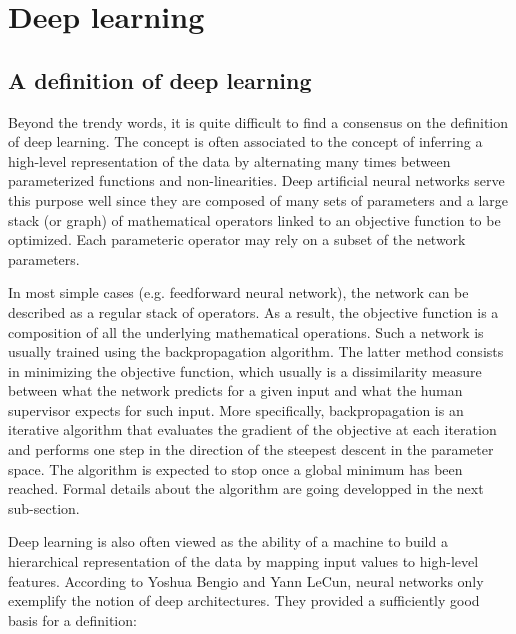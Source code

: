 \section{Deep learning}

    \subsection{A definition of deep learning}

        Beyond the trendy words, it is quite difficult to find a consensus
        on the definition of deep learning. The concept is often associated to
        the concept of inferring a high-level representation of the data
        by alternating many times between parameterized functions and non-linearities.
        Deep artificial neural networks serve this purpose well since they are composed of many sets of parameters and a large stack
        (or graph) of mathematical operators linked to an objective function to be optimized.
        Each parameteric operator may rely on a subset of the network parameters.
        
        In most simple cases (e.g. feedforward neural network), the network can be described as a regular stack of operators.
        As a result, the objective function is a composition of all the underlying mathematical operations.
        Such a network is usually trained using the backpropagation algorithm.
        The latter method consists in minimizing the objective function, which usually is a dissimilarity
        measure between what the network
        predicts for a given input and what the human supervisor expects for such input.
        More specifically, backpropagation is an iterative algorithm that evaluates the gradient of the
        objective at each iteration and performs one step in the direction of the steepest descent in the parameter space.
        The algorithm is expected to stop once a global minimum has been reached.
        Formal details about the algorithm are going developped in the next sub-section.

        Deep learning is also often viewed as the ability of a machine to build
        a hierarchical representation of the data by mapping input values to high-level features.
        According to Yoshua Bengio and Yann LeCun, neural networks only exemplify the notion of deep
        architectures. They provided a sufficiently good basis for a definition:


